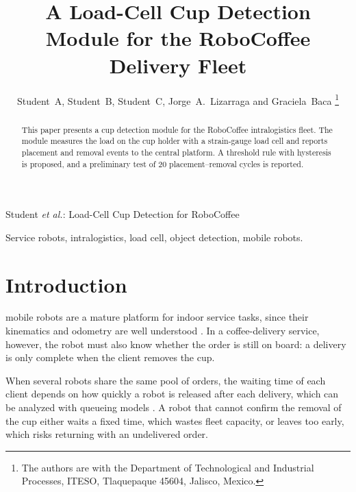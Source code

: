 \documentclass[lettersize,journal]{IEEEtran}
\begin{document}
\title{A Load-Cell Cup Detection Module for the RoboCoffee Delivery Fleet}

\author{Student~A, Student~B, Student~C, Jorge~A.~Lizarraga and Graciela~Baca
\thanks{The authors are with the Department of Technological and
Industrial Processes, ITESO, Tlaquepaque 45604, Jalisco, Mexico.}}

%
{Student \MakeLowercase{\textit{et al.}}: Load-Cell Cup Detection for RoboCoffee}

\maketitle

\begin{abstract}
This paper presents a cup detection module for the RoboCoffee intralogistics fleet. The module measures the load on the cup holder with a strain-gauge load cell and reports placement and removal events to the central platform. A threshold rule with hysteresis is proposed, and a preliminary test of 20 placement--removal cycles is reported.
\end{abstract}

\begin{IEEEkeywords}
Service robots, intralogistics, load cell, object detection, mobile robots.
\end{IEEEkeywords}

\section{Introduction}
\label{sec:intro}

 mobile robots are a mature platform for indoor service tasks, since their kinematics and odometry are well understood \cite{siegwart2011autonomous}. In a coffee-delivery service, however, the robot must also know whether the order is still on board: a delivery is only complete when the client removes the cup.

When several robots share the same pool of orders, the waiting time of each client depends on how quickly a robot is released after each delivery, which can be analyzed with queueing models \cite{kleinrock1975queueing}. A robot that cannot confirm the removal of the cup either waits a fixed time, which wastes fleet capacity, or leaves too early, which risks returning with an undelivered order.
\end{document}
